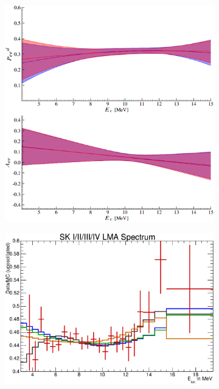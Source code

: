\begin{figure}[htbp]
    \centering
    \begin{subfigure}[b]{0.38\textwidth}
        \centering
    \includegraphics[width=\textwidth]{sno_pee}
        \caption[]{}
        \label{fig:sno_pee}
    \end{subfigure}
    \hfill
    \begin{subfigure}[b]{0.58\textwidth}
        \centering
    \includegraphics[width=\textwidth]{sk_spectrum}

\end{subfigure}
\end{figure}
